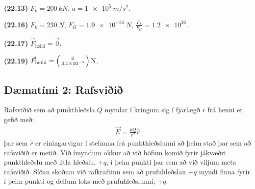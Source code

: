 \ifdefined \wholebook \else\documentclass[oneside]{book}\usepackage{EdlBook}\graphicspath{{figures/}}
\begin{document}
\begin{tcolorbox}
\begin{enumerate*}[label = \vspace{0.15cm} ]
  \item \textbf{(22.13)} $F_k = \SI{200}{kN}$, $a = \SI{1e5}{m/s^2}$.
  \item \textbf{(22.16)} $F_k = \SI{230}{N}$, $F_G = \SI{1.9e-34}{N}$, $\frac{F_k}{F_G} = \SI{1.2e36}{}$.
  \item \textbf{(22.17)} $\Vec{F}_{\text{heild}} = \vec{0}$.
  \item \textbf{(22.19)} $\displaystyle \vec{F}_{\text{heild}} = \smqty(0 \\ \SI{3.1e-4}{}) \, \si{N}$.
\end{enumerate*}
\end{tcolorbox}

\subsection*{Dæmatími 2: Rafsviðið}

\begin{tcolorbox}
Rafsviðið sem að punkthleðsla $Q$ myndar í kringum sig í fjarlægð $r$ frá henni er gefið með:
\begin{align*}
    \vec{E} = \frac{kQ}{r^2}\hat{r}
\end{align*}
þar sem $\hat{r}$ er einingarvigur í stefnuna frá punkthleðslunni að þeim stað þar sem að rafsviðið er metið. Við ímyndum okkur að við höfum komið fyrir jákvæðri punkthleðslu með litla hleðslu, $+q$, í þeim punkti þar sem að við viljum meta rafsviðið. Síðan skoðum við rafkraftinn sem að prufuhleðslan $+q$ myndi finna fyrir í þeim punkti og deilum loks með prufuhleðslunni, $+q$.
\end{tcolorbox}
\end{document}
